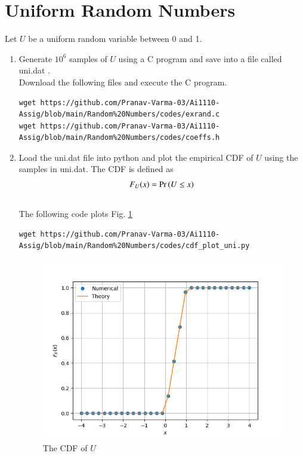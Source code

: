 \documentclass[journal,12pt,twocolumn]{IEEEtran}
\renewcommand\thesection{\arabic{section}}
\begin{document}
\section{Uniform Random Numbers}
Let $U$ be a uniform random variable between 0 and 1.
\begin{enumerate}[label=\thesection.\arabic*
,ref=\thesection.\theenumi]
\item Generate $10^6$ samples of $U$ using a C program and save into a file called uni.dat .
\\
\solution Download the following files and execute the  C program.
\begin{lstlisting}
wget https://github.com/Pranav-Varma-03/Ai1110-Assig/blob/main/Random%20Numbers/codes/exrand.c
wget https://github.com/Pranav-Varma-03/Ai1110-Assig/blob/main/Random%20Numbers/codes/coeffs.h
\end{lstlisting}
%
\item
Load the uni.dat file into python and plot the empirical CDF of $U$ using the samples in uni.dat. The CDF is defined as
\begin{align}
F_{U}(x) = \Pr\left(U \le x\right)
\end{align}
\\
\solution  The following code plots Fig. \ref{fig:uni_cdf}
\begin{lstlisting}
wget https://github.com/Pranav-Varma-03/Ai1110-Assig/blob/main/Random%20Numbers/codes/cdf_plot_uni.py
\end{lstlisting}

\begin{figure}[ht]
\centering
\includegraphics[width=\columnwidth]{./figs/cdf_plot_uni.png}
\caption{The CDF of $U$}
\label{fig:uni_cdf}
\end{figure}


\end{enumerate}
\end{document}
